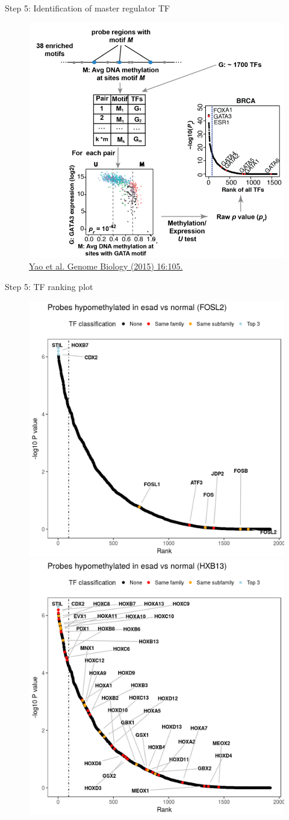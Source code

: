 \documentclass[slidestop,compress,11pt,xcolor=dvipsnames]{beamer}
\begin{document}
\begin{frame}{Step 5: Identification of master regulator TF}
 \vspace*{-0.5cm}
 \begin{figure}
  \centering
  \includegraphics[width=0.7\linewidth]{ELMER/tfrank.png}{\tiny{\\\href{https://genomebiology.biomedcentral.com/articles/10.1186/s13059-015-0668-3}{Yao et al. Genome Biology (2015) 16:105.}}}
 \end{figure}
\end{frame}

\begin{frame}{Step 5: TF ranking plot}
 \begin{figure}
  \centering
  \includegraphics[width=0.45\linewidth]{ELMER/FOS_TF.png}
  \includegraphics[width=0.45\linewidth]{ELMER/HOX_TF.png}
 \end{figure}
\end{frame}
\end{document}
